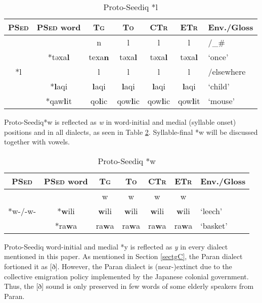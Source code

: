\documentclass[12pt]{article}
\newcommand{\psed}{\textsc{PSed}\xspace}
\newcommand{\psedf}{Proto-Seediq\xspace}
\newcommand{\stg}{\textsc{Tg}\xspace}
\newcommand{\sto}{\textsc{To}\xspace}
\newcommand{\sctr}{\textsc{CTr}\xspace}
\newcommand{\setr}{\textsc{ETr}\xspace}
\begin{document}
\begin{table}[!htbp]
\centering
\caption{Proto-Seediq *l}
\label{tab:l}
\begin{tabular}{c|c|cccc|l}
\textbf{\psed} & \textbf{\psed word}      & \textbf{\stg} & \textbf{\sto} & \textbf{\sctr} & \textbf{\setr} & \multicolumn{1}{c}{\textbf{Env./Gloss}} \\ \hline
\multirow{5}{*}{*l} & & n & l & l & l & /\_\# \\ \cline{2-7}
                    & *təxa\textbf{l} & texa\textbf{n} & təxa\textbf{l} & təxa\textbf{l} & təxa\textbf{l} & `once' \\  \cline{2-7}
                   &  & l & l & l & l & /elsewhere \\  \cline{2-7}
                   & *\textbf{l}aqi & \textbf{l}aqi & \textbf{l}aqi & \textbf{l}aqi & \textbf{l}aqi & `child' \\ 
                   & *qaw\textbf{l}it & qo\textbf{l}ic & qow\textbf{l}ic & qow\textbf{l}ic & qow\textbf{l}it & `mouse' \\ \hline
\end{tabular}
\end{table}

\psedf *w is reflected as \textit{w} in word-initial and medial (syllable onset) positions and in all dialects, as seen in Table \ref{tab:w}. Syllable-final *w will be discussed together with vowels.

\begin{table}[!htbp]
\centering
\caption{Proto-Seediq *w}
\label{tab:w}
\begin{tabular}{c|c|cccc|l}
\textbf{\psed} & \textbf{\psed word}      & \textbf{\stg} & \textbf{\sto} & \textbf{\sctr} & \textbf{\setr} & \multicolumn{1}{c}{\textbf{Env./Gloss}} \\ \hline
\multirow{3}{*}{*w-/-w-} & &  w & w & w & w \\ \cline{2-7}
                         & *\textbf{w}ili & \textbf{w}ili & \textbf{w}ili & \textbf{w}ili & \textbf{w}ili & `leech' \\
                         & *ra\textbf{w}a & ra\textbf{w}a & ra\textbf{w}a & ra\textbf{w}a & ra\textbf{w}a & `basket' \\ \hline
\end{tabular}
\end{table}

\psedf word-initial and medial *y is reflected as \textit{y} in every dialect mentioned in this paper. As mentioned in Section \ref{sectgC}, the Paran dialect fortioned it as [ð]. However, the Paran dialect is (near-)extinct due to the collective emigration policy implemented by the Japanese colonial government. Thus, the [ð] sound is only preserved in few words of some elderly speakers from Paran. 
\end{document}
